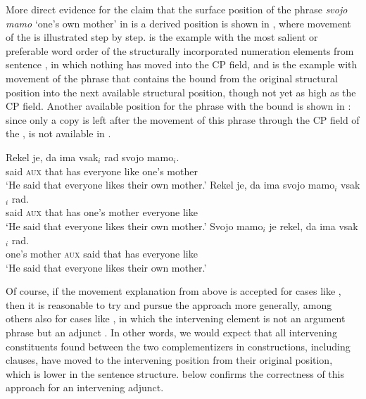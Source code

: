 \documentclass[output=paper,colorlinks,citecolor=brown]{langsci/langscibook}
\begin{document}
\noindent More direct evidence for the claim that the surface position of the phrase \textit{svojo mamo} `one’s own mother' in  is a derived position is shown in , where movement of the  is illustrated step by step.  is the example with the most salient or preferable word order of the structurally incorporated numeration elements from sentence , in which nothing has moved into the CP field, and  is the example with movement of the phrase that contains the bound  from the original structural position into the next available structural position, though not yet as high as the CP field. Another available position for the phrase with the bound  is shown in  : since only a copy is left after the movement of this phrase through the CP field of the ,  is not available in .

\begin{exe}
\ex \begin{xlist} \label{ex:plesnicar:five}
\ex \label{ex:plesnicar:fivea}\gll Rekel	je,	da	ima	vsak$_i$		rad	svojo	mamo$_i$.\\
	said	\textsc{aux}	that	has	everyone	like	one’s mother \\
\trans `He said that everyone likes their own mother.'
\ex \label{ex:plesnicar:fiveb}
\gll	Rekel	je,	da	ima	svojo	mamo$_i$	vsak$_i$		rad. 	\\
	said	\textsc{aux} that	has	one’s	mother	everyone	like \\
\trans `He said that everyone likes their own mother.'
\ex \label{ex:plesnicar:fivec}
\gll	Svojo	mamo$_i$	je	rekel,	da	ima	vsak$_i$		rad. 	\\
	one’s	mother	\textsc{aux} 	said	that	has	everyone	like \\
\trans `He said that everyone likes their own mother.'
\end{xlist}\end{exe}

\noindent Of course, if the movement explanation from above is accepted for cases like , then it is reasonable to try and pursue the approach more generally, among others also for cases like , in which the intervening element is not an argument phrase but an adjunct . In other words, we would expect that all intervening constituents found between the two complementizers in  constructions, including  clauses, have moved to the intervening position from their original position, which is lower in the sentence structure.  below confirms the correctness of this approach for an intervening  adjunct. %
\end{document}

